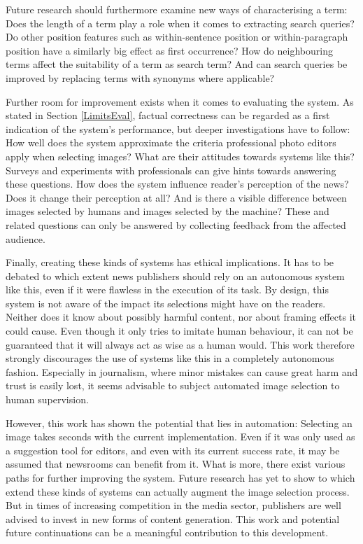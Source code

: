 \documentclass[11pt,a4paper,twoside]{article}
\begin{document}
Future research should furthermore examine new ways of characterising a term: Does the length of a term play a role when it comes to extracting search queries? Do other position features such as within-sentence position or within-paragraph position have a similarly big effect as first occurrence? How do neighbouring terms affect the suitability of a term as search term? And can search queries be improved by replacing terms with synonyms where applicable?

Further room for improvement exists when it comes to evaluating the system. As stated in Section \ref{LimitsEval}, factual correctness can be regarded as a first indication of the system's performance, but deeper investigations have to follow: How well does the system approximate the criteria professional photo editors apply when selecting images? What are their attitudes towards systems like this? Surveys and experiments with professionals can give hints towards answering these questions. How does the system influence reader's perception of the news? Does it change their perception at all? And is there a visible difference between images selected by humans and images selected by the machine? These and related questions can only be answered by collecting feedback from the affected audience.

Finally, creating these kinds of systems has ethical implications. It has to be debated to which extent news publishers should rely on an autonomous system like this, even if it were flawless in the execution of its task. By design, this system is not aware of the impact its selections might have on the readers. Neither does it know about possibly harmful content, nor about framing effects it could cause. Even though it only tries to imitate human behaviour, it can not be guaranteed that it will always act as wise as a human would. This work therefore strongly discourages the use of systems like this in a completely autonomous fashion. Especially in journalism, where minor mistakes can cause great harm and trust is easily lost, it seems advisable to subject automated image selection to human supervision.

\bigskip

However, this work has shown the potential that lies in automation: Selecting an image takes seconds with the current implementation. Even if it was only used as a suggestion tool for editors, and even with its current success rate, it may be assumed that newsrooms can benefit from it. What is more, there exist various paths for further improving the system. Future research has yet to show to which extend these kinds of systems can actually augment the image selection process. But in times of increasing competition in the media sector, publishers are well advised to invest in new forms of content generation. This work and potential future continuations can be a meaningful contribution to this development.
\end{document}

